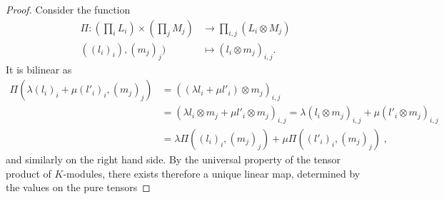 \documentclass{report}
\theoremstyle{definition}
\theoremstyle{remark}
\begin{document}
        \begin{proof}
                Consider the function
                \begin{equation*}
                \begin{split}
                        \Pi : (\prod_i L_i) \times (\prod_j M_j) & \to \prod_{i,j} (L_i \otimes M_j) \\
                        ( (l_i)_i ) , (m_j)_j ) & \mapsto (l_i \otimes m_j)_{i,j}.
                \end{split}
                \end{equation*}
                It is bilinear as
                \begin{equation*}
                        \begin{split}
                                \Pi( \lambda(l_i)_i + \mu(l'_i)_i , (m_j)_j) & = ((\lambda l_i + \mu l'_i) \otimes m_j )_{i,j} \\
                                & = (\lambda l_i \otimes m_j + \mu l'_i \otimes m_j)_{i,j} = \lambda (l_i \otimes m_j)_{i,j} + \mu(l'_i \otimes m_j)_{i,j} \\
                                & =\lambda \Pi((l_i)_i,(m_j)_j) + \mu \Pi( (l'_i)_i, (m_j)_j )\;,
                        \end{split}
                \end{equation*}
                and similarly on the right hand side. By the universal property of the tensor product of $K$-modules, there exists therefore a unique linear map,
                determined by the values on the pure tensors
                

\end{proof}
\end{document}
